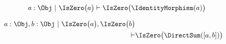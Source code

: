 \begin{sequent}
\begin{align*}
   a: \Obj ~|~ \IsZero \big( a \big) \vdash \IsZero \big( \IdentityMorphism( a ) \big)
\end{align*}
\end{sequent}

\begin{sequent}
\begin{align*}
   a: \Obj, b: \Obj ~|~ \IsZero \big( a \big), \IsZero \big( b \big) \\
   \vdash & \IsZero \big( \DirectSum( [ a, b ] ) \big)
\end{align*}
\end{sequent}
